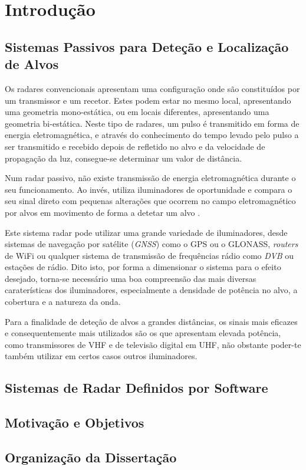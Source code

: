 % 
\chapter{Introdução} %
\label{chap:Chapter1} %


%




\section{Sistemas Passivos para Deteção e Localização de Alvos}
Os radares convencionais apresentam uma configuração onde são constituídos por um transmissor e um recetor. Estes podem estar no mesmo local, apresentando uma geometria mono-estática, ou em locais diferentes, apresentando uma geometria bi-estática. Neste tipo de radares, um pulso é transmitido em forma de energia eletromagnética, e através do conhecimento do tempo levado pelo pulso a ser transmitido e recebido depois de refletido no alvo e da velocidade de propagação da luz, consegue-se determinar um valor de distância.\par 
Num radar passivo, não existe transmissão de energia eletromagnética durante o seu funcionamento. Ao invés, utiliza iluminadores de oportunidade e compara o seu sinal direto com pequenas alterações que ocorrem no campo eletromagnético por alvos em movimento de forma a detetar um alvo \parencite{Griffiths2017}.\par 
Este sistema radar pode utilizar uma grande variedade de iluminadores, desde sistemas de navegação por satélite (\textit{\gls{GNSS}}) como o \gls{GPS} ou o GLONASS, \textit{routers} de WiFi ou qualquer sistema de transmissão de frequências rádio como \textit{\gls{DVB}} ou estações de rádio. Dito isto, por forma a dimensionar o sistema para o efeito desejado, torna-se necessário uma boa compreensão das mais diversas caraterísticas dos iluminadores, especialmente a densidade de potência no alvo, a cobertura e a natureza da onda.\par 
Para a finalidade de deteção de alvos a grandes distâncias, os sinais mais eficazes e consequentemente mais utilizados são os que apresentam elevada potência, como transmissores de \gls{VHF} e de televisão digital em \gls{UHF}, não obstante poder-te também utilizar em certos casos outros iluminadores.

\section{Sistemas de Radar Definidos por Software}


\section{Motivação e Objetivos}


\section{Organização da Dissertação}